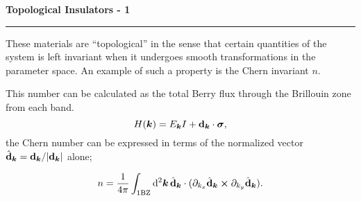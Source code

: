 
\begin{frame}
	\begin{block}{\color{white}\textbf{\Large{
					Topological Insulators - 1
		}}}
		\vspace{-10pt}\rule{\textwidth}{0.5pt}
		\color{white}
		
		
		These materials are “topological” in the sense that certain quantities of the system is left invariant when it undergoes smooth transformations in the parameter space. An example of such a property is the Chern invariant $n$.
		
		This number can be calculated as the total Berry flux through the Brillouin zone from each band. 
		\begin{equation*}
			\label{eq:hamiltonian_pseudomagnetic}
			H(\bm{k}) = E_{\bm{k}}I + \vb d_{\bm{k}}\cdot\bm\sigma, 
		\end{equation*}
		the Chern number can be expressed in terms of the normalized vector $\hat{\vb{d}}_{\bm{k}} = \vb{d}_{\bm{k}} / |\vb{d}_{\bm{k}}|$ alone;
	
		
	\end{block}
	{\large
			\begin{equation*}
			n = \frac{1}{4\pi}\int_{1\text{BZ}}\dd[2]{\bm{k}}\hat{\vb{d}}_{\bm{k}} \cdot(\partial_{k_x}\hat{\vb{d}}_{\bm{k}}\cross\partial_{k_y}\hat{\vb{d}}_{\bm{k}}).
		\end{equation*}
	
	}
	
%		
%		
\end{frame}



